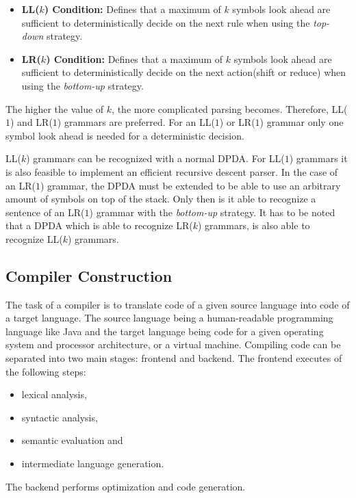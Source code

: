 \begin{itemize}
    \item \textbf{LL($k$) Condition:} Defines that a maximum of $k$ symbols look ahead are sufficient to deterministically decide on the next rule when using the \textit{top-down} strategy.
    \item \textbf{LR($k$) Condition:} Defines that a maximum of $k$ symbols look ahead are sufficient to deterministically decide on the next action(shift or reduce) when using the \textit{bottom-up} strategy.
\end{itemize}

The higher the value of $k$, the more complicated parsing becomes. Therefore, LL($1$) and LR($1$) grammars are preferred. For an LL($1$) or LR($1$) grammar only one symbol look ahead is needed for a deterministic decision. 

LL($k$) grammars can be recognized with a normal DPDA. For LL($1$) grammars it is also feasible to implement an efficient recursive descent parser. In the case of an LR($1$) grammar, the DPDA must be extended to be able to use an arbitrary amount of symbols on top of the stack. Only then is it able to recognize a sentence of an LR($1$) grammar with the \textit{bottom-up} strategy. It has to be noted that a DPDA which is able to recognize LR($k$) grammars, is also able to recognize LL($k$) grammars.

\subsection{Compiler Construction}

The task of a compiler is to translate code of a given source language into code of a target language. The source language being a human-readable programming language like Java and the target language being code for a given operating system and processor architecture, or a virtual machine. Compiling code can be separated into two main stages: frontend and backend.
The frontend executes of the following steps:
\begin{itemize}
    \item lexical analysis,
    \item syntactic analysis,
    \item semantic evaluation and
    \item intermediate language generation.
\end{itemize}

The backend performs optimization and code generation.

